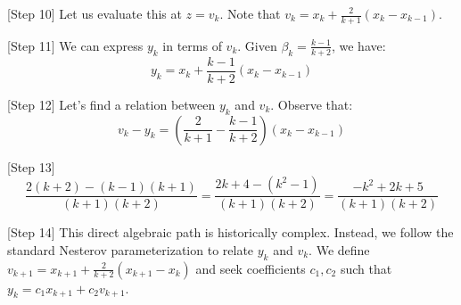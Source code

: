 \documentclass{article}
\begin{document}
[Step 10] Let us evaluate this at $z = v_k$. Note that $v_k = x_k + \frac{2}{k+1}(x_k - x_{k-1})$.

[Step 11] We can express $y_k$ in terms of $v_k$. Given $\beta_k = \frac{k-1}{k+2}$, we have:
$$y_k = x_k + \frac{k-1}{k+2}(x_k - x_{k-1})$$

[Step 12] Let's find a relation between $y_k$ and $v_k$. Observe that:
$$v_k - y_k = \left(\frac{2}{k+1} - \frac{k-1}{k+2}\right) (x_k - x_{k-1})$$

[Step 13] $$\frac{2(k+2) - (k-1)(k+1)}{(k+1)(k+2)} = \frac{2k+4 - (k^2-1)}{(k+1)(k+2)} = \frac{-k^2+2k+5}{(k+1)(k+2)}$$

[Step 14] This direct algebraic path is historically complex. Instead, we follow the standard Nesterov parameterization to relate $y_k$ and $v_k$. We define $v_{k+1} = x_{k+1} + \frac{2}{k+2}(x_{k+1} - x_k)$ and seek coefficients $c_1, c_2$ such that $y_k = c_1 x_{k+1} + c_2 v_{k+1}$.
\end{document}
